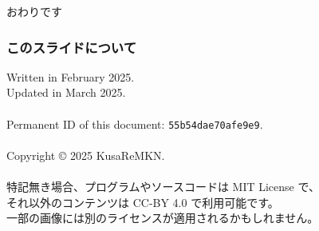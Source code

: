 \documentclass[
  lualatex,
  aspectratio=169,
  14pt
]{beamer}
\begin{document}
\begin{frame}[standout]
  おわりです
\end{frame}

\begin{frame}
  \frametitle{このスライドについて}

  Written in February 2025.\\
  Updated in March 2025.
  \\~\\[-.5\baselineskip]

  Permanent ID of this document: \texttt{55b54dae70afe9e9}.
  \\~\\[-.5\baselineskip]

  Copyright © 2025 KusaReMKN.
  \\~\\[-.5\baselineskip]

  特記無き場合、プログラムやソースコードは MIT License で、\\
  \hspace{1.5\zw}それ以外のコンテンツは CC-BY 4.0 で利用可能です。\\
  \hspace{1.5\zw}一部の画像には別のライセンスが適用されるかもしれません。
\end{frame}
\end{document}
